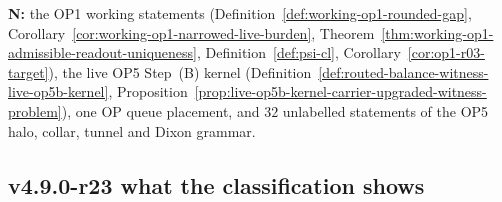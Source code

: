 \noindent\textbf{N:} the OP1 working statements (Definition~\ref{def:working-op1-rounded-gap},
Corollary~\ref{cor:working-op1-narrowed-live-burden}, Theorem~\ref{thm:working-op1-admissible-readout-uniqueness},
Definition~\ref{def:psi-cl}, Corollary~\ref{cor:op1-r03-target}), the live OP5 Step~(B) kernel
(Definition~\ref{def:routed-balance-witness-live-op5b-kernel},
Proposition~\ref{prop:live-op5b-kernel-carrier-upgraded-witness-problem}), one OP queue placement, and \(32\) unlabelled
statements of the OP5 halo, collar, tunnel and Dixon grammar.

\subsection*{v4.9.0-r23 what the classification shows}
\label{subsec:v490-r23-findings}

